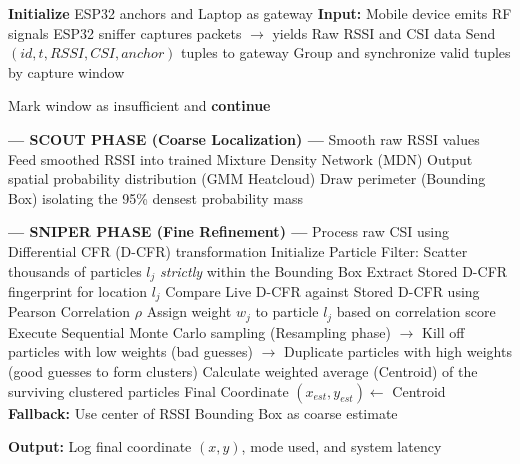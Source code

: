 \begin{algorithm}[htbp]
\caption{Proposed Hybrid Coarse-to-Fine Localization (Scout/Sniper)}
\label{alg:proposed_hybrid}
\begin{algorithmic}[1]
\State \textbf{Initialize} ESP32 anchors and Laptop as gateway
    \State \textbf{Input:} Mobile device emits RF signals
    \State ESP32 sniffer captures packets $\to$ yields Raw RSSI and CSI data
    \State Send $(id, t, RSSI, CSI, anchor)$ tuples to gateway
    \State Group and synchronize valid tuples by capture window
    
        \State Mark window as insufficient and \textbf{continue}
    \EndIf
    
    \Statex \textbf{--- SCOUT PHASE (Coarse Localization) ---}
    \State Smooth raw RSSI values
    \State Feed smoothed RSSI into trained Mixture Density Network (MDN)
    \State Output spatial probability distribution (GMM Heatcloud)
    \State Draw perimeter (Bounding Box) isolating the 95\% densest probability mass
    
    \Statex \textbf{--- SNIPER PHASE (Fine Refinement) ---}
        \State Process raw CSI using Differential CFR (D-CFR) transformation
        \State Initialize Particle Filter: Scatter thousands of particles $l_j$ \textit{strictly} within the Bounding Box
            \State Extract Stored D-CFR fingerprint for location $l_j$
            \State Compare Live D-CFR against Stored D-CFR using Pearson Correlation $\rho$
            \State Assign weight $w_j$ to particle $l_j$ based on correlation score
        \EndFor
        \State Execute Sequential Monte Carlo sampling (Resampling phase)
        \State \quad $\to$ Kill off particles with low weights (bad guesses)
        \State \quad $\to$ Duplicate particles with high weights (good guesses to form clusters)
        \State Calculate weighted average (Centroid) of the surviving clustered particles
        \State Final Coordinate $(x_{est}, y_{est}) \gets$ Centroid
    \Else
        \State \textbf{Fallback:} Use center of RSSI Bounding Box as coarse estimate
    \EndIf
    
    \State \textbf{Output:} Log final coordinate $(x, y)$, mode used, and system latency
\EndWhile
\end{algorithmic}
\end{algorithm}

